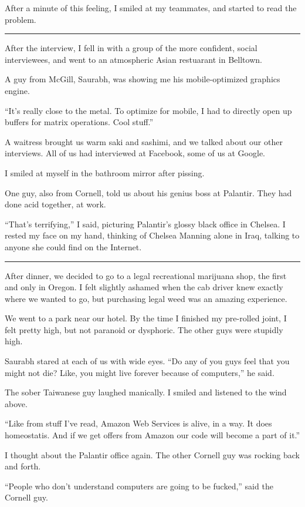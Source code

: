 After a minute of this feeling, I smiled at my teammates, and started to read
the problem.

\plainfancybreak{12pt}{2}{* * *}

After the interview, I fell in with a group of the more confident, social
interviewees, and went to an atmospheric Asian restuarant in Belltown.

A guy from McGill, Saurabh, was showing me his mobile-optimized graphics engine.

``It's really close to the metal.  To optimize for mobile, I had to directly
open up buffers for matrix operations.  Cool stuff.''

A waitress brought us warm saki and sashimi, and we talked about our other
interviews.  All of us had interviewed at Facebook, some of us at Google.  

I smiled at myself in the bathroom mirror after pissing.

One guy, also from Cornell, told us about his genius boss at Palantir.  They had
done acid together, at work.

``That's terrifying,'' I said, picturing Palantir's glossy black office in
Chelsea.  I rested my face on my hand, thinking of Chelsea Manning alone in
Iraq, talking to anyone she could find on the Internet.

\plainfancybreak{12pt}{2}{* * *}

After dinner, we decided to go to a legal recreational marijuana shop, the first
and only in Oregon.  I felt slightly ashamed when the cab driver knew exactly
where we wanted to go, but purchasing legal weed was an amazing experience.

We went to a park near our hotel.  By the time I finished my pre-rolled joint, I
felt pretty high, but not paranoid or dysphoric.  The other guys were stupidly
high. 

Saurabh stared at each of us with wide eyes.  ``Do any of you guys feel that you
might not die?  Like, you might live forever because of computers,'' he said.

The sober Taiwanese guy laughed manically.  I smiled and listened to the wind
above.

``Like from stuff I've read, Amazon Web Services is alive, in a way.  It does
homeostatis.  And if we get offers from Amazon our code will become a part of
it.''

I thought about the Palantir office again.  The other Cornell guy was rocking
back and forth.

``People who don't understand computers are going to be fucked,''
said the Cornell guy.

